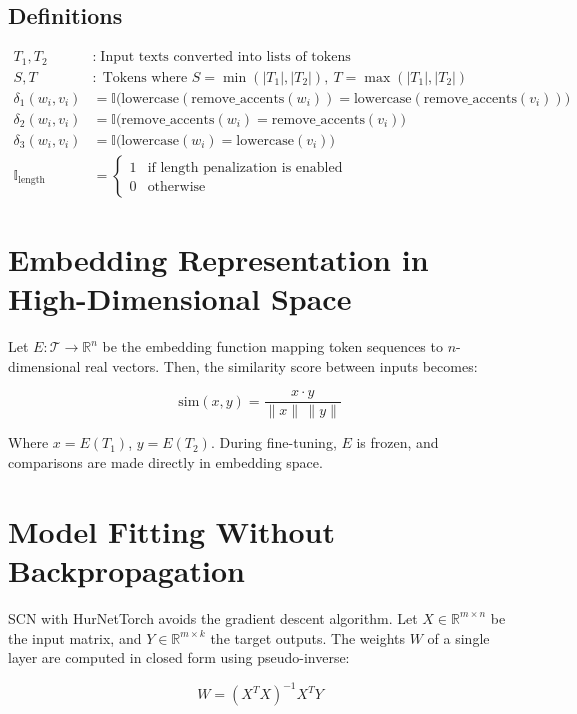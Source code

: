 \documentclass[11pt]{article}
\begin{document}
\subsection*{Definitions}
\begin{align*}
T_1, T_2 &:\; \text{Input texts converted into lists of tokens} \\
S, T &:\; \text{Tokens where } S = \min(|T_1|, |T_2|),\ T = \max(|T_1|, |T_2|) \\
\delta_1(w_i, v_i) &= \mathbb{I}\bigl(\text{lowercase}(\mathrm{remove\_accents}(w_i)) = \text{lowercase}(\mathrm{remove\_accents}(v_i))\bigr) \\
\delta_2(w_i, v_i) &= \mathbb{I}\bigl(\mathrm{remove\_accents}(w_i) = \mathrm{remove\_accents}(v_i)\bigr) \\
\delta_3(w_i, v_i) &= \mathbb{I}\bigl(\text{lowercase}(w_i) = \text{lowercase}(v_i)\bigr) \\
\mathbb{I}_{\text{length}} &=
\begin{cases}
1 & \text{if length penalization is enabled} \\
0 & \text{otherwise}
\end{cases}
\end{align*}

\section{Embedding Representation in High-Dimensional Space}
Let $E: \mathcal{T} \rightarrow \mathbb{R}^n$ be the embedding function mapping token sequences to $n$-dimensional real vectors. Then, the similarity score between inputs becomes:

\begin{equation}
\text{sim}(x, y) = \frac{x \cdot y}{\|x\| \, \|y\|}
\end{equation}

Where $x = E(T_1)$, $y = E(T_2)$. During fine-tuning, $E$ is frozen, and comparisons are made directly in embedding space.

\section{Model Fitting Without Backpropagation}
SCN with HurNetTorch avoids the gradient descent algorithm. Let $X \in \mathbb{R}^{m \times n}$ be the input matrix, and $Y \in \mathbb{R}^{m \times k}$ the target outputs. The weights $W$ of a single layer are computed in closed form using pseudo-inverse:

\begin{equation}
W = (X^T X)^{-1} X^T Y
\end{equation}
\end{document}
